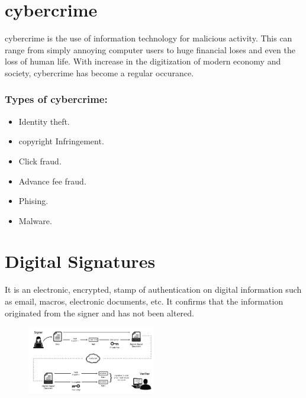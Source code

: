 \documentclass[twocolumn, 12pt, a4paper]{article}
\begin{document}
\section{cybercrime}
cybercrime is the use of information technology for malicious activity. This 
can range from simply annoying computer users to huge financial loses and even
the loss of human life. With increase in the digitization of modern economy
and society, cybercrime has become a regular occurance.
\subsubsection*{Types of cybercrime:}
\begin{itemize}
  \item Identity theft.
  \item copyright Infringement.
  \item Click fraud.
  \item Advance fee fraud.
  \item Phising.
  \item Malware.
\end{itemize}

\section{Digital Signatures}
It is an electronic, encrypted, stamp of authentication on digital information
such as email, macros, electronic documents, etc. It confirms that the
information originated from the signer and has not been altered.
\begin{figure}[h]
  \centering
  \includegraphics[width=0.5\textwidth]{key}
\end{figure}
\end{document}
